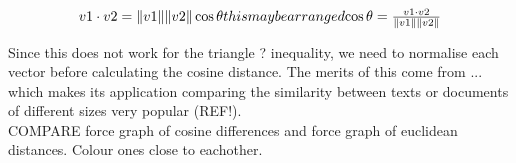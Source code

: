 \begin{equation}
v1 \cdot v2 = \|v1\|\|v2\| \cos \theta
$$this may be arranged$$
\cos \theta = \frac{ v1 \cdot v2}{\|v1\|\|v2\|}
\end{equation}

Since this does not work for the triangle ? inequality, we need to normalise each vector before calculating the cosine distance. The merits of this come from  ... which makes its application comparing the similarity between texts or documents of different sizes very popular (REF!). \\


COMPARE force graph of cosine differences and force graph of euclidean distances. Colour ones close to eachother. \\


